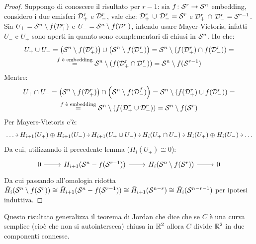 \begin{proof}
  Suppongo di conoscere il risultato per $ r - 1 $: sia
  $ f \colon \mathcal{S}^{r} \to \mathcal{S}^{n} $ embedding, considero i due emisferi
  $ \mathcal{D}^{r}_+ $ e $ \mathcal{D}^{r}_- $, vale che:
  $ \mathcal{D}^{r}_+ \, \cup \, \mathcal{D}^{r}_- = \mathcal{S}^{r} $ e
  $ \mathcal{D}^{r}_+ \, \cap \, \mathcal{D}^{r}_- = \mathcal{S}^{r-1} $. Sia
  $ U_+ = \mathcal{S}^{n} \setminus f(\mathcal{D}^{r}_+) $ e
  $ U_- = \mathcal{S}^{n} \setminus f(\mathcal{D}^{r}_-) $, intendo usare Mayer-Vietoris, infatti $ U_- $ e
  $ U_+ $ sono aperti in quanto sono complementari di chiusi in $ \mathcal{S}^{n} $.
  Ho che:
  \begin{gather*}
    U_+ \cup U_- = \left(\mathcal{S}^{n} \setminus f(\mathcal{D}^{r}_+) \right) \cup \left( \mathcal{S}^{n} \setminus f(\mathcal{D}^{r}_-) \right) =
    \mathcal{S}^{n} \setminus (f(\mathcal{D}^{r}_+) \cap  f(\mathcal{D}^{r}_-)) = \\
   \overset{\text{$ f $ è embedding}} {=}  \mathcal{S}^{n} \setminus (f(\mathcal{D}^{r}_+  \cap  \mathcal{D}^{r}_-)) = \mathcal{S}^{n} \setminus f(\mathcal{S}^{r-1})
  \end{gather*}
  Mentre:
  \begin{gather*}
    U_+ \cap U_- = \left(\mathcal{S}^{n} \setminus f(\mathcal{D}^{r}_+) \right) \cap \left(\mathcal{S}^{n} \setminus f(\mathcal{D}^{f}_-) \right) =
    \mathcal{S}^{n} \setminus (f(\mathcal{D}^{r}_+) \cup  f(\mathcal{D}^{r}_-)) = \\
    \overset{\text{$ f $ è embedding}} {=}  \mathcal{S}^{n} \setminus (f(\mathcal{D}^{r}_+  \cup  \mathcal{D}^{r}_-)) = \mathcal{S}^{n} \setminus f(\mathcal{S}^{r})
  \end{gather*}
  Per Mayers-Vietoris c'è:
  \[
    \begin{tikzcd}[nodes={column sep = 5pt, inner sep = 2pt}]
      \dots \rar & H_{i+1}(U_+) \oplus H_{i+1}(U_-) \rar & H_{i+1}(U_+ \cup U_-) \rar & H_i(U_+ \cap U_-) \rar & H_i (U_+) \oplus H_i(U_-)
      \rar & \dots
    \end{tikzcd}
  \]
  Da cui, utilizzando il precedente lemma ($ H_i(U_\pm) \cong 0 $):
  \[
    \begin{tikzcd}
      0 \rar & H_{i+1}(\Sph{n} - f(\Sph{r-1})) \rar & H_i(\Sph{n} \setminus f(\Sph{r})) \rar & 0
    \end{tikzcd}
  \]
  Da cui passando all'omologia ridotta
  $ \tilde{H}_i(\mathcal{S}^{n} \setminus f(\mathcal{S}^{r})) \cong \tilde{H}_{i+1}(\mathcal{S}^{n} - f(\mathcal{S}^{r-1})) \cong \tilde{H}_{i+1}(\mathcal{S}^{n-r}) \cong \tilde{H}_i(\mathcal{S}^{n-r-1}) $
  per ipotesi induttiva.
\end{proof}

Questo risultato generalizza il teorema di Jordan che
dice che se $ C $ è una curva semplice (cioè che non si autointerseca) chiusa in
$ \mathbb{R}^{2} $ allora $ C $ divide $ \mathbb{R}^{2} $ in due componenti connesse.

